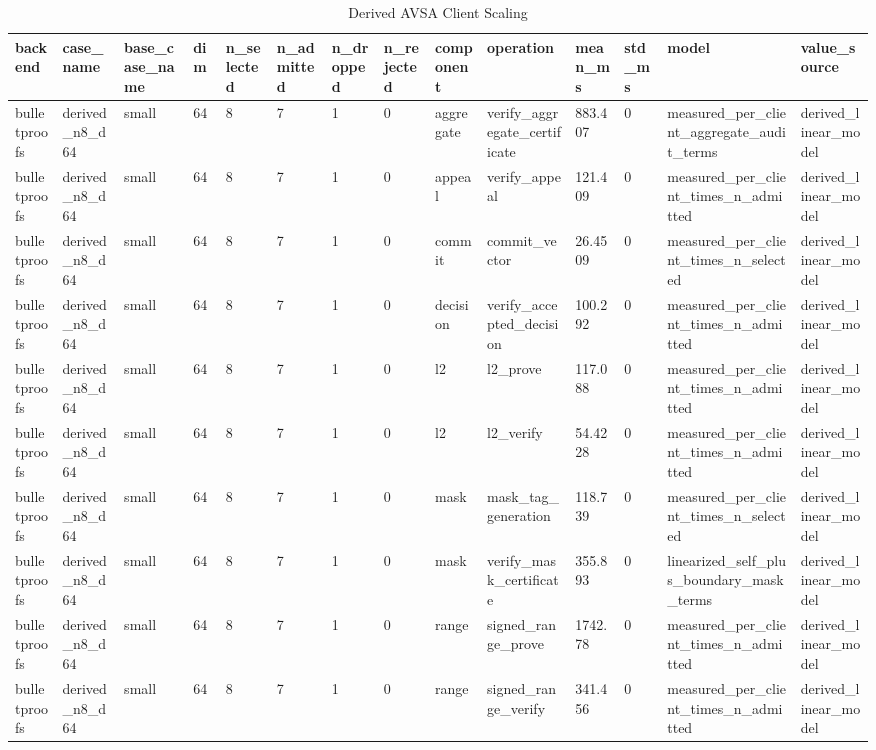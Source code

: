 \begin{table}[t]
\centering
\small
\caption{Derived AVSA Client Scaling}
\begin{tabular}{llllllllllllll}
\toprule
backend & case\_name & base\_case\_name & dim & n\_selected & n\_admitted & n\_dropped & n\_rejected & component & operation & mean\_ms & std\_ms & model & value\_source \\
\midrule
bulletproofs & derived\_n8\_d64 & small & 64 & 8 & 7 & 1 & 0 & aggregate & verify\_aggregate\_certificate & 883.407 & 0 & measured\_per\_client\_aggregate\_audit\_terms & derived\_linear\_model \\
bulletproofs & derived\_n8\_d64 & small & 64 & 8 & 7 & 1 & 0 & appeal & verify\_appeal & 121.409 & 0 & measured\_per\_client\_times\_n\_admitted & derived\_linear\_model \\
bulletproofs & derived\_n8\_d64 & small & 64 & 8 & 7 & 1 & 0 & commit & commit\_vector & 26.4509 & 0 & measured\_per\_client\_times\_n\_selected & derived\_linear\_model \\
bulletproofs & derived\_n8\_d64 & small & 64 & 8 & 7 & 1 & 0 & decision & verify\_accepted\_decision & 100.292 & 0 & measured\_per\_client\_times\_n\_admitted & derived\_linear\_model \\
bulletproofs & derived\_n8\_d64 & small & 64 & 8 & 7 & 1 & 0 & l2 & l2\_prove & 117.088 & 0 & measured\_per\_client\_times\_n\_admitted & derived\_linear\_model \\
bulletproofs & derived\_n8\_d64 & small & 64 & 8 & 7 & 1 & 0 & l2 & l2\_verify & 54.4228 & 0 & measured\_per\_client\_times\_n\_admitted & derived\_linear\_model \\
bulletproofs & derived\_n8\_d64 & small & 64 & 8 & 7 & 1 & 0 & mask & mask\_tag\_generation & 118.739 & 0 & measured\_per\_client\_times\_n\_selected & derived\_linear\_model \\
bulletproofs & derived\_n8\_d64 & small & 64 & 8 & 7 & 1 & 0 & mask & verify\_mask\_certificate & 355.893 & 0 & linearized\_self\_plus\_boundary\_mask\_terms & derived\_linear\_model \\
bulletproofs & derived\_n8\_d64 & small & 64 & 8 & 7 & 1 & 0 & range & signed\_range\_prove & 1742.78 & 0 & measured\_per\_client\_times\_n\_admitted & derived\_linear\_model \\
bulletproofs & derived\_n8\_d64 & small & 64 & 8 & 7 & 1 & 0 & range & signed\_range\_verify & 341.456 & 0 & measured\_per\_client\_times\_n\_admitted & derived\_linear\_model \\

\end{tabular}
\end{table}
